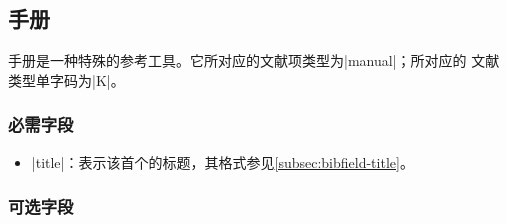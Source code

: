 
\subsection{手册}\label{subsec:bibtype-manual}

手册是一种特殊的参考工具。它所对应的{\BibTeX}文献项类型为|manual|；所对应的
文献类型单字码为|K|\cite{gbt3469-1983}。

\subsubsection{必需字段}

\begin{itemize}
\item |title|：表示该首个的标题，其格式参见\ref{subsec:bibfield-title}。
\end{itemize}

\subsubsection{可选字段}

